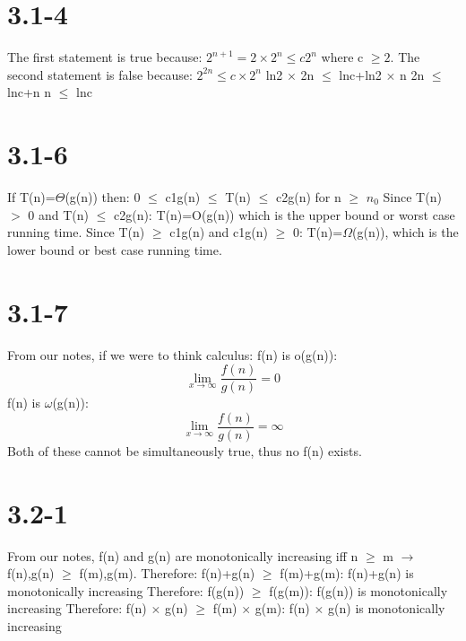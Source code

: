\documentclass[12pt]{article}
\begin{document}
\section{3.1-4}
The first statement is true because: \newline
$2^{n+1}=2 \times 2^n \leq c2^n$ where c $\geq 2$. \newline \newline  
The second statement is false because: \newline
$2^{2n} \leq c \times 2^n$ \newline 
ln2 $\times$ 2n $\leq$ lnc+ln2 $\times$ n \newline
2n $\leq$ lnc+n \newline
n $\leq$ lnc 

\section{3.1-6}
If T(n)=$\Theta$(g(n)) then: 0 $\leq$ c1g(n) $\leq$ T(n) $\leq$ c2g(n) for n $\geq$ $n_0$ \newline
Since T(n) $>$ 0 and T(n) $\leq$ c2g(n): T(n)=O(g(n)) which is the upper bound or worst case running time. \newline
Since T(n) $\geq$ c1g(n) and c1g(n) $\geq$ 0: T(n)=$\Omega$(g(n)), which is the lower bound or best case running time.

\section{3.1-7}
From our notes, if we were to think calculus: \newline
f(n) is o(g(n)): $$\lim_{x\to\infty} \frac{f(n)}{g(n)}=0$$ \newline
f(n) is $\omega$(g(n)): $$\lim_{x\to\infty} \frac{f(n)}{g(n)}=\infty$$ \newline
Both of these cannot be simultaneously true, thus no f(n) exists.

\section{3.2-1}
From our notes, f(n) and g(n) are monotonically increasing iff n $\geq$ m $\rightarrow$ f(n),g(n) $\geq$ f(m),g(m). \newline \newline
Therefore: f(n)+g(n) $\geq$ f(m)+g(m): f(n)+g(n) is monotonically increasing \newline
Therefore: f(g(n)) $\geq$ f(g(m)): f(g(n)) is monotonically increasing \newline
Therefore: f(n) $\times$ g(n) $\geq$ f(m) $\times$ g(m): f(n) $\times$ g(n) is monotonically increasing 
\end{document}
